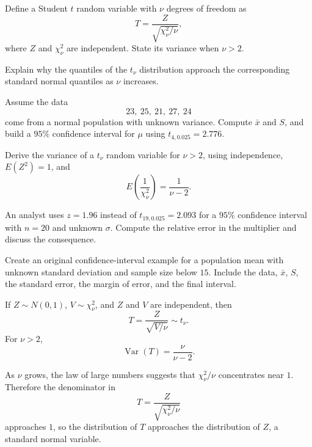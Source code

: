 \begin{problema}\label{prob:3de3320}
Define a Student $t$ random variable with $\nu$ degrees of freedom as
\[
	T=\frac{Z}{\sqrt{\chi^2_\nu/\nu}},
\]
where $Z$ and $\chi^2_\nu$ are independent. State its variance when $\nu>2$.
\end{problema}

\begin{problema}\label{prob:03aebae}
Explain why the quantiles of the $t_\nu$ distribution approach the corresponding standard normal quantiles as $\nu$ increases.
\end{problema}

\begin{problema}\label{prob:e378132}
Assume the data
\[
	23,\ 25,\ 21,\ 27,\ 24
\]
come from a normal population with unknown variance. Compute $\bar x$ and $S$, and build a $95\%$ confidence interval for $\mu$ using $t_{4,0.025}=2.776$.
\end{problema}

\begin{problema}\label{prob:7943b46}
Derive the variance of a $t_\nu$ random variable for $\nu>2$, using independence, $E(Z^2)=1$, and
\[
	E\left(\frac{1}{\chi^2_\nu}\right)=\frac{1}{\nu-2}.
\]
\end{problema}

\begin{problema}\label{prob:bbda1fa}
An analyst uses $z=1.96$ instead of $t_{19,0.025}=2.093$ for a $95\%$ confidence interval with $n=20$ and unknown $\sigma$. Compute the relative error in the multiplier and discuss the consequence.
\end{problema}

\begin{problema}\label{prob:c34507c}
Create an original confidence-interval example for a population mean with unknown standard deviation and sample size below $15$. Include the data, $\bar x$, $S$, the standard error, the margin of error, and the final interval.
\end{problema}

\begin{solproblema}[prob:3de3320]
If $Z\sim N(0,1)$, $V\sim \chi^2_\nu$, and $Z$ and $V$ are independent, then
\[
	T=\frac{Z}{\sqrt{V/\nu}}\sim t_\nu.
\]
For $\nu>2$,
\[
	\operatorname{Var}(T)=\frac{\nu}{\nu-2}.
\]
\end{solproblema}

\begin{solproblema}
As $\nu$ grows, the law of large numbers suggests that $\chi^2_\nu/\nu$ concentrates near $1$. Therefore the denominator in
\[
	T=\frac{Z}{\sqrt{\chi^2_\nu/\nu}}
\]
approaches $1$, so the distribution of $T$ approaches the distribution of $Z$, a standard normal variable.
\end{solproblema}

